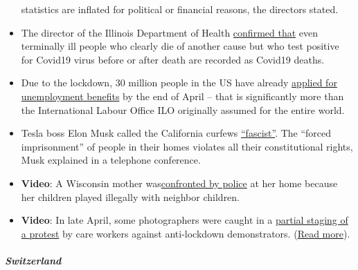\begin{itemize}
  statistics are inflated for political or financial reasons, the
  directors stated.
\item
  The director of the Illinois Department of Health
  \href{https://week.com/2020/04/20/idph-director-explains-how-covid-deaths-are-classified/}{confirmed
  that} even terminally ill people who clearly die of another cause but
  who test positive for Covid19 virus before or after death are recorded
  as Covid19 deaths.
\item
  Due to the lockdown, 30 million people in the US have already
  \href{https://edition.cnn.com/2020/04/30/economy/unemployment-benefits-coronavirus/index.html}{applied
  for unemployment benefits} by the end of April -- that is
  significantly more than the International Labour Office ILO originally
  assumed for the entire world.
\item
  Tesla boss Elon Musk called the California curfews
  \href{https://www.theguardian.com/technology/2020/apr/29/tesla-quarterly-earnings-coronavirus-shares}{``fascist''}.
  The ``forced imprisonment'' of people in their homes violates all
  their constitutional rights, Musk explained in a telephone conference.
\item
  \textbf{Video}: A Wisconsin mother
  was\href{https://twitter.com/AlexBerenson/status/1256219418343981056}{confronted
  by police} at her home because her children played illegally with
  neighbor children.
\item
  \textbf{Video}: In late April, some photographers were caught in a
  \href{https://twitter.com/talialikeitis/status/1253126254942773248}{partial
  staging of a protest} by care workers against anti-lockdown
  demonstrators.
  (\href{https://www.buzzfeednews.com/article/tasneemnashrulla/photos-denver-nurses-block-anti-lockdown-protest}{Read
  more}).
\end{itemize}

\hypertarget{switzerland}{%
\subparagraph{\texorpdfstring{\textbf{Switzerland}}{Switzerland}}\label{switzerland}}

